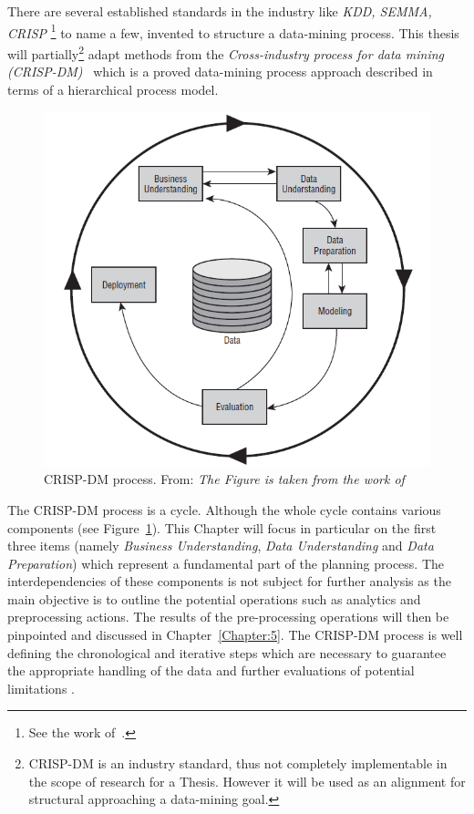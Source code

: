 There are several  established standards in the industry like \textit{KDD, SEMMA, CRISP} \footnote{See the work of~\cite{Azevedo;Santos;Filipe:2008}.} to name a few, invented to structure a data-mining process. This thesis will partially\footnote{CRISP-DM is an industry standard, thus not completely implementable in the scope of research for a Thesis. However it will be used as an alignment for structural approaching a data-mining goal.} adapt methods from the \textit{Cross-industry process for data mining (CRISP-DM)}~\cite{crisp} which is a proved data-mining process approach described in terms of a hierarchical process model.
\begin{figure}[h!]
    \centering
    \includegraphics[scale=0.5]{Graphics/crisp-dm.png}
    \caption{CRISP-DM process. From: \textit{The Figure is taken from the work of}~\cite{crisp}}
    \label{fig:crisp-dm}
\end{figure}

The CRISP-DM process is a cycle. Although the whole cycle contains various components (see Figure~\ref{fig:crisp-dm}). This Chapter will focus in particular on the first three items (namely \textit{Business Understanding}, \textit{Data Understanding} and \textit{Data Preparation}) which represent a fundamental part of the planning process. The interdependencies of these components is not subject for further analysis as the main objective is to outline the potential operations such as analytics and preprocessing actions. The results of the pre-processing operations will then be pinpointed and discussed in Chapter~\ref{Chapter:5}. The CRISP-DM process is well defining the chronological and iterative steps which are necessary to guarantee the appropriate handling of the data and further evaluations of potential limitations \cite{crisp}.  

